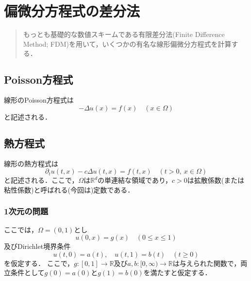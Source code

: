\chapter{偏微分方程式の差分法}
\begin{abstract}
もっとも基礎的な数値スキームである有限差分法(Finite Difference Method; FDM)を用いて，いくつかの有名な線形偏微分方程式を計算する．
\end{abstract}


\section{Poisson方程式}
線形のPoisson方程式は
\begin{equation}
\label{e:poisson}
-\Delta u(x)=f(x)\quad(x\in\Omega)
\end{equation}
と記述される．

%



\section{熱方程式}
線形の熱方程式は
\begin{equation}
\label{e:heat}
\partial_t u(t,x)-c\Delta u(t,x)=f(t,x)\quad(t>0,\ x\in\Omega)
\end{equation}
と記述される．ここで，$\Omega$は$\mathbb{R}^d$の単連結な領域であり，$c>0$は拡散係数(または粘性係数)と呼ばれる(今回は)定数である．


\subsection{ 1次元の問題}
ここでは，$\Omega=(0,1)$とし
\begin{equation}
u(0,x)=g(x)\quad(0\le x\le1)
\end{equation}
及びDirichlet境界条件
\begin{equation}
u(t,0)=a(t),\quad u(t,1)=b(t)\quad(t\ge0)
\end{equation}
を仮定する．
ここで，$g:[0,1]\to\mathbb{R}$及び$a,b:[0,\infty)\to\mathbb{R}$は与えられた関数で，両立条件として$g(0)=a(0)$と$g(1)=b(0)$を満たすと仮定する．

